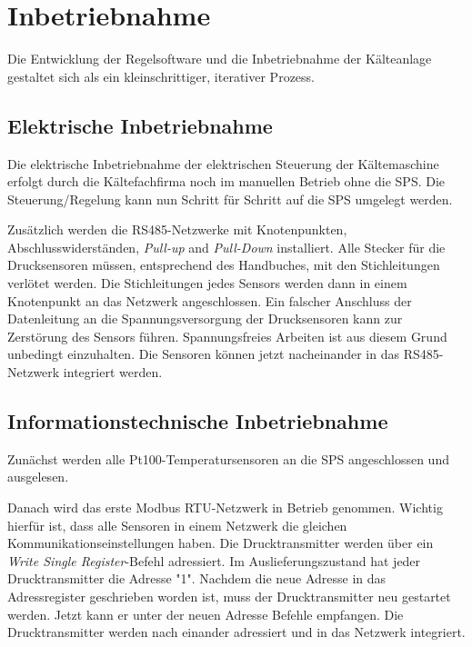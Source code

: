 \chapter{Inbetriebnahme}
\label{cha:Inbetriebnahme}

Die Entwicklung der Regelsoftware und die Inbetriebnahme der Kälteanlage gestaltet sich als ein kleinschrittiger, iterativer Prozess. 

\section{Elektrische Inbetriebnahme}
\label{Inbetriebnahme_ACDC}

Die elektrische Inbetriebnahme der elektrischen Steuerung der Kältemaschine erfolgt durch die Kältefachfirma noch im manuellen Betrieb ohne die SPS. Die Steuerung/Regelung kann nun Schritt für Schritt auf die SPS umgelegt werden.

Zusätzlich werden die RS485-Netzwerke mit Knotenpunkten, Abschlusswiderständen, \textit{Pull-up} and \textit{Pull-Down} installiert. Alle Stecker für die Drucksensoren müssen, entsprechend des Handbuches, mit den Stichleitungen verlötet werden. Die Stichleitungen jedes Sensors werden dann in einem Knotenpunkt an das Netzwerk angeschlossen. Ein falscher Anschluss der Datenleitung an die Spannungsversorgung der Drucksensoren kann zur Zerstörung des Sensors führen. Spannungsfreies Arbeiten ist aus diesem Grund unbedingt einzuhalten. \citep{KELLER2015}
Die Sensoren können jetzt nacheinander in das RS485-Netzwerk integriert werden. 

\section{Informationstechnische Inbetriebnahme}
\label{sec:Inbetriebnahme_IT}

Zunächst werden alle Pt100-Temperatursensoren an die SPS angeschlossen und ausgelesen. 

Danach wird das erste Modbus RTU-Netzwerk in Betrieb genommen. Wichtig hierfür ist, dass alle Sensoren in einem Netzwerk die gleichen Kommunikationseinstellungen haben. Die Drucktransmitter werden über ein \textit{Write Single Register}-Befehl adressiert. Im Auslieferungszustand hat jeder Drucktransmitter die Adresse "1". Nachdem die neue Adresse in das Adressregister geschrieben worden ist, muss der Drucktransmitter neu gestartet werden. Jetzt kann er unter der neuen Adresse Befehle empfangen. 
Die Drucktransmitter werden nach einander adressiert und in das Netzwerk integriert. 

